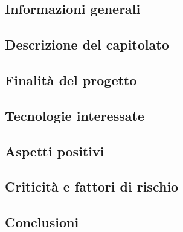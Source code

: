 \subsection{Informazioni generali}


\subsection{Descrizione del capitolato}


\subsection{Finalità del progetto}


\subsection{Tecnologie interessate}


\subsection{Aspetti positivi}


\subsection{Criticità e fattori di rischio}


\subsection{Conclusioni}

